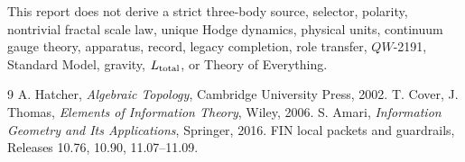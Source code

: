 \documentclass[11pt,a4paper]{article}
\begin{document}
This report does not derive a strict three-body source, selector, polarity,
nontrivial fractal scale law, unique Hodge dynamics, physical units, continuum
gauge theory, apparatus, record, legacy completion, role transfer,
\(QW\)-2191, Standard Model, gravity, \(L_{\rm total}\), or Theory of
Everything.

\begin{thebibliography}{9}
 A. Hatcher, \emph{Algebraic Topology}, Cambridge University
Press, 2002.
 T. Cover, J. Thomas, \emph{Elements of Information Theory},
Wiley, 2006.
 S. Amari, \emph{Information Geometry and Its Applications},
Springer, 2016.
 FIN local packets and guardrails, Releases 10.76, 10.90,
11.07--11.09.
\end{thebibliography}
\end{document}
